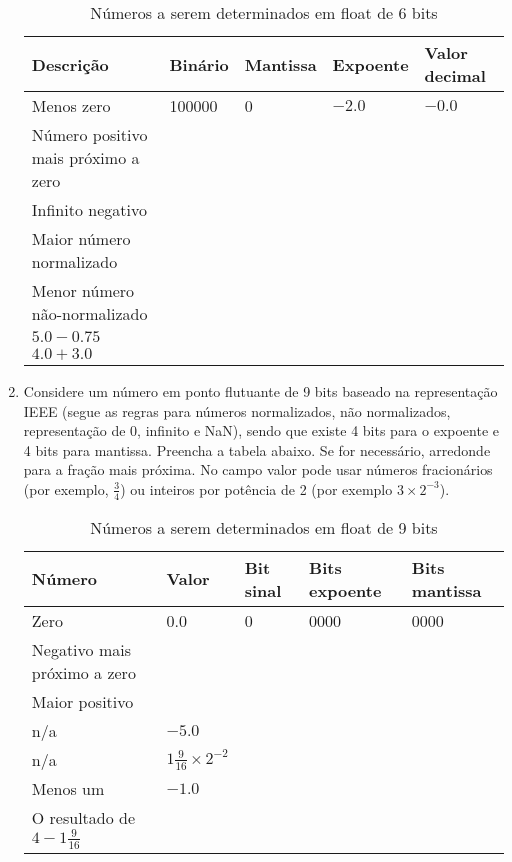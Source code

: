 \begin{enumerate}[resume]
    \begin{table}[H]
        \begin{tabular}{|l|l|l|l|l|}
            \hline
            \textbf{Descrição}  & 
            \textbf{Binário}    & 
            \textbf{Mantissa}   &
            \textbf{Expoente}   &
            \textbf{Valor decimal} \\\hline
            Menos zero & 100000 & 0 & $-2.0$ & $-0.0$ \\\hline
            Número positivo mais próximo a zero & & & & \\\hline
            Infinito negativo & & & & \\\hline
            Maior número normalizado & & & & \\\hline
            Menor número não-normalizado & & & & \\\hline
            $5.0 - 0.75$ & & & & \\\hline
            $4.0 + 3.0$ & & & & \\
            \hline
        \end{tabular}
        \label{tab:float 6 bits}
        \caption{Números a serem determinados em float de 6 bits}
    \end{table}

    \item
    Considere um número em ponto flutuante de 9 bits 
    baseado na representação IEEE (segue as regras para números normalizados,
    não normalizados, representação de 0, infinito e NaN), sendo que 
    existe 4 bits para o expoente e 4 bits para mantissa.
    Preencha a tabela abaixo.
    Se for necessário, arredonde para a fração mais próxima.
    No campo valor pode usar números fracionários (por exemplo, $\frac{3}{4}$)
    ou inteiros por potência de 2 (por exemplo $3\times2^{-3}$).

    \begin{table}[H]
        \begin{tabular}{|l|l|l|l|l|}
            \hline
            \textbf{Número}  & 
            \textbf{Valor}    & 
            \textbf{Bit sinal}   &
            \textbf{Bits expoente}   &
            \textbf{Bits mantissa} \\\hline
            Zero & 0.0 & 0 & 0000 & 0000 \\\hline
            Negativo mais próximo a zero & & & & \\\hline
            Maior positivo & & & & \\\hline
            n/a & $-5.0$ & & & \\\hline
            n/a & $1\frac{9}{16}\times2^{-2}$ & & & \\\hline
            Menos um & $-1.0$ & & & \\\hline
            O resultado de $4-1\frac{9}{16}$ & & & & \\
            \hline
        \end{tabular}
        \label{tab:float 9 bits}
        \caption{Números a serem determinados em float de 9 bits}
    \end{table}


\end{enumerate}
